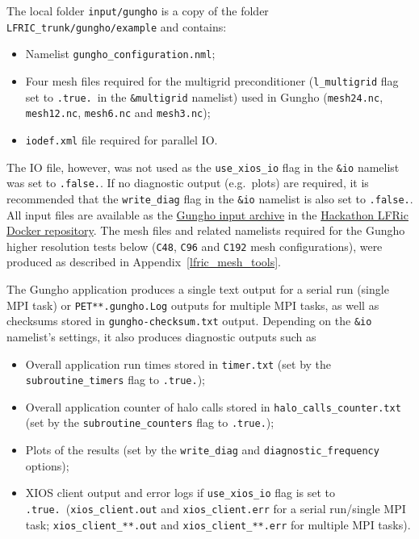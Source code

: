 \documentclass[twoside,a4paper,12pt]{article}
\begin{document}
The local folder \texttt{input/gungho} is a copy of the folder
\texttt{LFRIC\_trunk/gungho/example} and contains:

\begin{itemize}

\item Namelist \texttt{gungho\_configuration.nml};

\item Four mesh files required for the multigrid preconditioner
(\texttt{l\_multigrid} flag set to \texttt{.true.}\ in the \texttt{\&multigrid}
namelist) used in Gungho (\texttt{mesh24.nc}, \texttt{mesh12.nc},
\texttt{mesh6.nc} and \texttt{mesh3.nc});

\item \texttt{iodef.xml} file required for parallel IO.

\end{itemize}

The IO file, however, was not used as the \texttt{use\_xios\_io} flag in the
\texttt{\&io} namelist was set to \texttt{.false.}. If no diagnostic output
(e.g.\ plots) are required, it is recommended that the \texttt{write\_diag} flag
in the \texttt{\&io} namelist is also set to \texttt{.false.}. All input
files are available as the
\href{https://github.com/eth-cscs/ContainerHackathon/blob/master/LFRIC/docker/input-gungho.tar.gz}
{Gungho input archive} in the
\href{https://github.com/eth-cscs/ContainerHackathon/tree/master/LFRIC/docker}
{Hackathon LFRic Docker repository}. The mesh files and related namelists
required for the Gungho higher resolution tests below (\texttt{C48},
\texttt{C96} and \texttt{C192} mesh configurations), were produced as described
in Appendix~\ref{lfric_mesh_tools}.

The Gungho application produces a single text output for a serial run (single
MPI task) or \texttt{PET**.gungho.Log} outputs for multiple MPI tasks, as well
as checksums stored in \texttt{gungho-checksum.txt} output. Depending on the
\texttt{\&io} namelist's settings, it also produces diagnostic outputs such as

\begin{itemize}

\item Overall application run times stored in \texttt{timer.txt} (set by the
\texttt{subroutine\_timers} flag to \texttt{.true.});

\item Overall application counter of halo calls stored in
\texttt{halo\_calls\_counter.txt} (set by the \texttt{subroutine\_counters} flag
to \texttt{.true.});

\item Plots of the results (set by the \texttt{write\_diag} and
\texttt{diagnostic\_frequency} options);

\item XIOS client output and error logs if \texttt{use\_xios\_io} flag is set to
\texttt{.true.}\ (\texttt{xios\_client.out} and \texttt{xios\_client.err} for a
serial run/single MPI task; \texttt{xios\_client\_**.out} and
\texttt{xios\_client\_**.err} for multiple MPI tasks).

\end{itemize}
%
%
\end{document}

